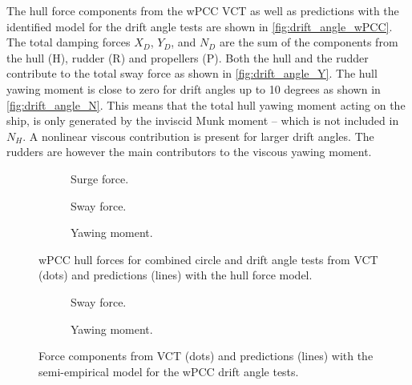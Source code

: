 The hull force components from the wPCC VCT as well as predictions with the identified model for the drift angle tests are shown in \autoref{fig:drift_angle_wPCC}. The total damping forces $X_D$, $Y_D$, and $N_D$ are the sum of the components from the hull (H), rudder (R) and propellers (P). Both the hull and the rudder contribute to the total sway force as shown in \autoref{fig:drift_angle_Y}. The hull yawing moment is close to zero for drift angles up to 10 degrees as shown in \autoref{fig:drift_angle_N}. This means that the total hull yawing moment acting on the ship, is only generated by the inviscid Munk moment -- which is not included in $N_H$. A nonlinear viscous contribution is present for larger drift angles. The rudders are however the main contributors to the viscous yawing moment.   
\begin{figure}[h]
     \centering
     \begin{subfigure}[b]{0.49\textwidth}
         \centering
         
        \caption{Surge force.}
        \label{fig:drift_angle_X}
     \end{subfigure}
     \hfill
     \begin{subfigure}[b]{0.49\textwidth}
         \centering
         
        \caption{Sway force.}
        \label{fig:drift_angle_Y}
     \end{subfigure}
     \vfill
     \begin{subfigure}[b]{0.49\textwidth}
         \centering
         
        \caption{Yawing moment.}
        \label{fig:drift_angle_N}
     \end{subfigure}
    \caption{wPCC hull forces for combined circle and drift angle tests from VCT (dots) and predictions (lines) with the hull force model.}
    \label{fig:drift_angle_wPCC}
\end{figure}
\begin{figure}[h]
     \centering
     \begin{subfigure}[b]{0.49\textwidth}
         \centering
         
        \caption{Sway force.}
        \label{fig:circle_drift_Y_H}
     \end{subfigure}
     \hfill
     \begin{subfigure}[b]{0.49\textwidth}
         \centering
         
        \caption{Yawing moment.}
        \label{fig:circle_drift_N_H}
     \end{subfigure}
    \caption{Force components from VCT (dots) and predictions (lines) with the semi-empirical model for the wPCC drift angle tests.}
    \label{fig:overshoots_wPCC}
\end{figure}

